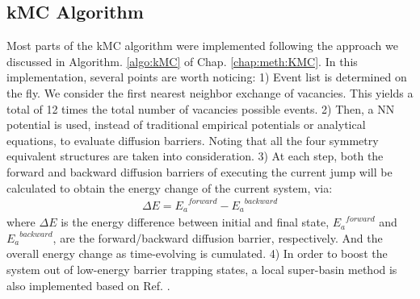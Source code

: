 \subsection{\acf{kMC} Algorithm}
Most parts of the \ac{kMC} algorithm were implemented following the approach we discussed in Algorithm. \ref{algo:kMC} of Chap. \ref{chap:meth:KMC}. In this implementation, several points are worth noticing: 1) Event list is determined on the fly. We consider the first nearest neighbor exchange of vacancies. This yields a total of 12 times the total number of vacancies possible events. 2) Then, a \ac{NN} potential is used, instead of traditional empirical potentials or analytical equations, to evaluate diffusion barriers. Noting that all the four symmetry equivalent structures are taken into consideration. 3) At each step, both the forward and backward diffusion barriers of executing the current jump will be calculated to obtain the energy change of the current system, via:
\begin{align}
\Delta E = {E_a}^{forward} - {E_a}^{backward}
\label{Chap:Al/Vac:eq:barrier-EDiff}
\end{align}
where $\Delta E$ is the energy difference between initial and final state, ${E_a}^{forward}$ and ${E_a}^{backward}$, are the forward/backward diffusion barrier, respectively. And the overall energy change as time-evolving is cumulated. 4) In order to boost the system out of low-energy barrier trapping states, a local super-basin method is also implemented based on Ref. \cite{fichthorn2013local}.


